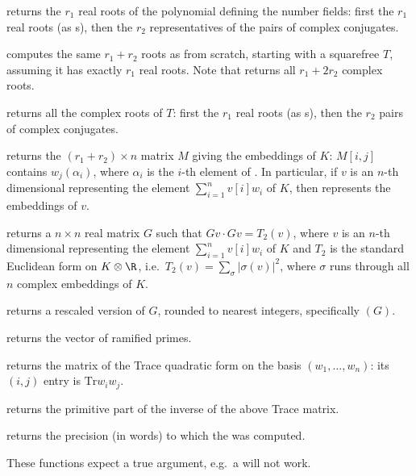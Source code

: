  returns the $r_1$ real roots of the polynomial
defining the number fields: first the $r_1$ real roots (as s), then
the $r_2$ representatives of the pairs of complex conjugates.

 computes the same
$r_1+r_2$ roots as  from scratch, starting with
a squarefree  $T$, assuming it has exactly $r_1$ real roots.
Note that  returns all $r_1 + 2r_2$ complex roots.

 returns all the complex roots of $T$:
first the $r_1$ real roots (as s), then the $r_2$ pairs of complex
conjugates.

 returns the $(r_1+r_2)\times n$ matrix $M$
giving the embeddings of $K$: $M[i,j]$ contains $w_j(\alpha_i)$, where
$\alpha_i$ is the $i$-th element of . In particular,
if $v$ is an $n$-th dimensional  representing the element
$\sum_{i=1}^n v[i] w_i$ of $K$, then  represents the
embeddings of $v$.

 returns a $n\times n$ real matrix $G$ such that
$Gv \cdot Gv = T_2(v)$, where $v$ is an $n$-th dimensional 
representing the element $\sum_{i=1}^n v[i] w_i$ of $K$ and $T_2$ is the
standard Euclidean form on $K\otimes \R$, i.e.~$T_2(v)
= \sum_{\sigma} |\sigma(v)|^2$, where $\sigma$ runs through all $n$ complex
embeddings of $K$.

 returns a rescaled version of $G$, rounded
to nearest integers, specifically $(G)$.

 returns the vector of ramified
primes.

 returns the matrix of the Trace quadratic form
on the basis $(w_1,\ldots,w_n)$: its $(i,j)$ entry is $\text{Tr} w_i w_j$.

 returns the primitive part of the inverse of
the above Trace matrix.

 returns the precision (in words) to which the
 was computed.


These functions expect a true  argument, e.g.~a  will not
work.

